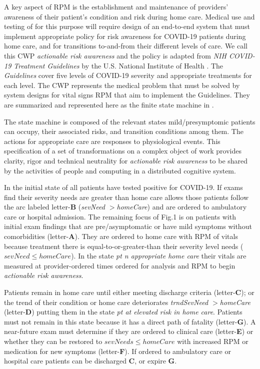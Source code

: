 
A key aspect of RPM is the establishment and maintenance of providers' awareness of their patient’s condition and risk during home care.
Medical use and testing of \phware for this purpose will require design of an end-to-end system that must implement appropriate policy for risk awareness for COVID-19 patients during home care, and for transitions to-and-from their different levels of care.
We call this CWP \emph{actionable risk awareness} and the policy is adapted from \emph{NIH COVID-19 Treatment Guidelines} by the U.S. National Institute of Health \cite{NIH}.
The \emph{Guidelines} cover five levels of COVID-19 severity and appropriate treatments for each level.
The CWP represents the medical problem that must be solved by system designs for vital signs RPM that aim to implement the Guidelines.
They are summarized and represented here as the finite state machine in .

The state machine is composed of the relevant states mild/presymptomic patients can occupy, their associated risks, and transition conditions among them. The actions for appropriate care are responses to physiological events. This specification of a set of transformations on a complex object of work provides clarity, rigor and technical neutrality for \emph{actionable risk awareness} to be shared by the activities of people and computing in a distributed cognitive system.

In the initial state of  all patients have tested positive for COVID-19. If exams find their severity needs are greater than home care allows those patients follow the arc labeled letter-\textbf{B}  (\emph{sevNeed $>$homeCare}) and are ordered to ambulatory care or hospital admission.
The remaining focus of Fig.1 is on patients with initial exam findings that are pre/asymptomatic or have mild symptoms without comorbidities (letter-\textbf{A}).
They are ordered to home care with RPM of vitals because treatment there is equal-to-or-greater-than their severity level needs (\emph{$sevNeed \le homeCare$}).
In the state \emph{pt n appropriate home care} their vitals are measured at provider-ordered times ordered for analysis and RPM to begin \emph{actionable risk awareness}.

Patients remain in home care until either meeting discharge criteria (letter-\textbf{C}); or the trend of their condition or home care deteriorates \emph{trndSevNeed $>$homeCare} (letter-\textbf{D}) putting them in the state \emph{pt at elevated risk in home care}.
Patients must not remain in this state because it has a direct path of fatality (letter-\textbf{G}).
A near-future exam must determine if they are ordered to clinical care (letter-\textbf{E}) or whether they can be restored to \emph{$sevNeeds\le homeCare$} with increased RPM or medication for new symptoms (letter-\textbf{F}).
If ordered to ambulatory care or hospital care patients can be discharged \textbf{C}, or expire \textbf{G}.

